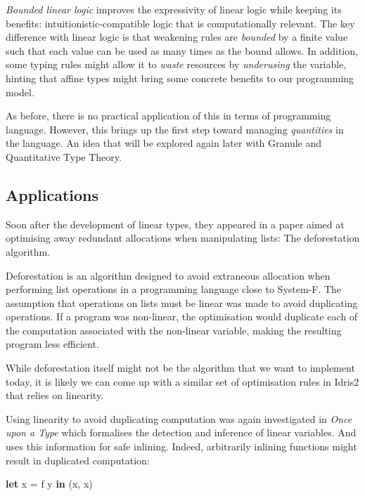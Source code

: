 \documentclass[
]{article}
\newenvironment{Shaded}{}{}
\newcommand{\KeywordTok}[1]{\textcolor[rgb]{0.00,0.44,0.13}{\textbf{#1}}}
\newcommand{\NormalTok}[1]{#1}
\newcommand{\OtherTok}[1]{\textcolor[rgb]{0.00,0.44,0.13}{#1}}
\begin{document}
\emph{Bounded linear logic}\cite{bll} improves the expressivity of
linear logic while keeping its benefits: intuitionistic-compatible logic
that is computationally relevant. The key difference with linear logic
is that weakening rules are \emph{bounded} by a finite value such that
each value can be used as many times as the bound allows. In addition,
some typing rules might allow it to \emph{waste} resources by
\emph{underusing} the variable, hinting that affine types might bring
some concrete benefits to our programming model.

As before, there is no practical application of this in terms of
programming language. However, this brings up the first step toward
managing \emph{quantities} in the language. An idea that will be
explored again later with
Granule\cite{granule}\cite{effect_coeffects_grading}\cite{graded_monads_rings}\cite{monads_and_effects}
and Quantitative Type Theory\cite{qtt}\cite{nuttin}.

\hypertarget{applications}{%
\subsection{Applications}\label{applications}}

Soon after the development of linear types, they appeared in a paper
aimed at optimising away redundant allocations when manipulating lists:
The deforestation algorithm.

Deforestation\cite{deforestation} is an algorithm designed to avoid
extraneous allocation when performing list operations in a programming
language close to System-F. The assumption that operations on lists must
be linear was made to avoid duplicating operations. If a program was
non-linear, the optimisation would duplicate each of the computation
associated with the non-linear variable, making the resulting program
less efficient.

While deforestation itself might not be the algorithm that we want to
implement today, it is likely we can come up with a similar set of
optimisation rules in Idris2 that relies on linearity.

Using linearity to avoid duplicating computation was again investigated
in \emph{Once upon a Type}\cite{once_upon_a_type} which formalises the
detection and inference of linear variables. And uses this information
for safe inlining. Indeed, arbitrarily inlining functions might result
in duplicated computation:

\begin{Shaded}
\begin{Highlighting}[]
\KeywordTok{let}\NormalTok{ x }\OtherTok{=}\NormalTok{ f y }\KeywordTok{in}
\NormalTok{    (x, x)}
\end{Highlighting}
\end{Shaded}
\end{document}
